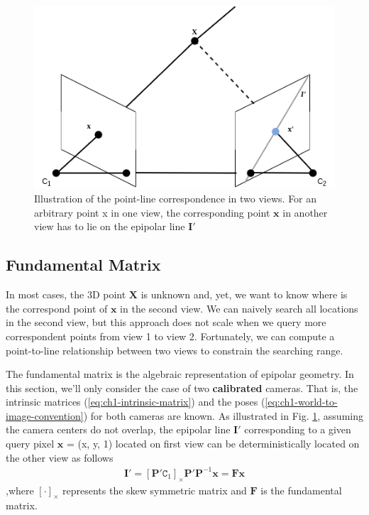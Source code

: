 \begin{figure}[htpb]
	\centering
	\includegraphics[scale=0.3]{figures/ch1/epipolar-line.png}
	\caption{Illustration of the point-line correspondence in two views. For an arbitrary point x in one view, the corresponding point $\mathbf{x}$ in another view has to lie on the epipolar line $\mathbf{I'}$}
	\label{fig:ch1-epipolar-line}
\end{figure}

\subsection{Fundamental Matrix}
In most cases, the 3D point $\mathbf{X}$ is unknown and, yet, we want to know where is the correspond point of $\mathbf{x}$ in the second view. We can naively search all locations in the second view, but this approach does not scale when we query more correspondent points from view 1 to view 2. Fortunately, we can compute a point-to-line relationship between two views to constrain the searching range.

The fundamental matrix is the algebraic representation of epipolar geometry. In this section, we'll only consider the case of two \textbf{calibrated} cameras. That is, the intrinsic matrices (\ref{eq:ch1-intrinsic-matrix}) and the poses (\ref{eq:ch1-world-to-image-convention}) for both cameras are known.
As illustrated in Fig. \ref{fig:ch1-epipolar-line}, assuming the camera centers do not overlap, the epipolar line $\mathbf{I'}$ corresponding to a given query pixel $\mathbf{x}$ = (x, y, 1) located on first view can be deterministically located on the other view as follows \cite{book:multivew-geometry}
\begin{gather}
\label{eq:epipolar-line}
	\mathbf{I'} = 
	[\mathbf{P'}\mathtt{C}_1]_\times \mathbf{P'} \mathbf{P}^{-1}\mathbf{x}
	= \mathbf{F}\mathbf{x}
\end{gather}
,where $[\cdot]_{\times}$ represents the skew symmetric matrix and $\mathbf{F}$ is the fundamental matrix. 

